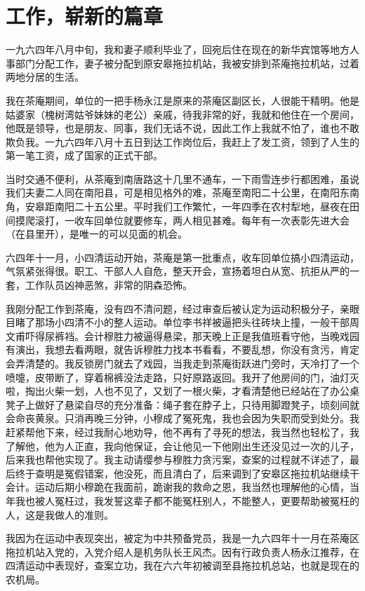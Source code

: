 \chapter{工作，崭新的篇章}

一九六四年八月中旬，我和妻子顺利毕业了，回宛后住在现在的新华宾馆等地方人事部门分配工作，妻子被分配到原安皋拖拉机站，我被安排到茶庵拖拉机站，过着两地分居的生活。

我在茶庵期间，单位的一把手杨永江是原来的茶庵区副区长，人很能干精明。他是姑婆家（槐树湾姑爷妹妹的老公）亲戚，待我非常的好，我就和他住在一个房间，他既是领导，也是朋友、同事，我们无话不说，因此工作上我就不怕了，谁也不敢欺负我。一九六四年八月十五日到达工作岗位后，我赶上了发工资，领到了人生的第一笔工资，成了国家的正式干部。

当时交通不便利，从茶庵到南唐路这十几里不通车，一下雨雪连步行都困难，虽说我们夫妻二人同在南阳县，可是相见格外的难，茶庵至南阳二十公里，在南阳东南角，安皋距南阳二十五公里。平时我们工作繁忙，一年四季在农村犁地，昼夜在田间摸爬滚打，一收车回单位就要修车，两人相见甚难。每年有一次表彰先进大会（在县里开），是唯一的可以见面的机会。

六四年十一月，小四清运动开始，茶庵是第一批重点，收车回单位搞小四清运动，气氛紧张得很。职工、干部人人自危，整天开会，宣扬着坦白从宽、抗拒从严的一套，工作队员凶神恶煞，非常的阴森恐怖。

我刚分配工作到茶庵，没有四不清问题，经过审查后被认定为运动积极分子，亲眼目睹了那场小四清不小的整人运动。单位李书祥被逼把头往砖块上撞，一般干部周文甫吓得尿裤裆。会计穆胜力被逼得悬梁，那天晚上正是我值班看守他，当晚戏园有演出，我想去看两眼，就告诉穆胜力找本书看看，不要乱想，你没有贪污，肯定会弄清楚的。我反锁房门就去了戏园，当我走到茶庵街跃进门旁时，天冷打了一个喷嚏，皮带断了，穿着棉裤没法走路，只好原路返回。我开了他房间的门，油灯灭啦，掏出火柴一划，人也不见了，又划了一根火柴，才看清楚他已经站在了办公桌凳子上做好了悬梁自尽的充分准备：绳子套在脖子上，只待用脚蹬凳子，顷刻间就会命丧黄泉。只消再晚三分钟，小穆成了冤死鬼，我也会因为失职而受到处分。我赶紧帮他下来，经过我耐心地劝导，他不再有了寻死的想法，我当然也轻松了，我了解他，他为人正直，我向他保证，会让他见一下他刚出生还没见过一次的儿子，后来我也帮他实现了。我主动请缨参与穆胜力贪污案，查案的过程就不详述了，最后终于查明是冤假错案，他没死，而且清白了，后来调到了安皋区拖拉机站继续干会计。运动后期小穆跪在我面前，跪谢我的救命之恩，我当然也理解他的心情，当年我也被人冤枉过，我发誓这辈子都不能冤枉别人，不能整人，更要帮助被冤枉的人，这是我做人的准则。

我因为在运动中表现突出，被定为中共预备党员，我是一九六四年十一月在茶庵区拖拉机站入党的，入党介绍人是机务队长王风杰。因有行政负责人杨永江推荐，在四清运动中表现好，查案立功，我在六六年初被调至县拖拉机总站，也就是现在的农机局。

